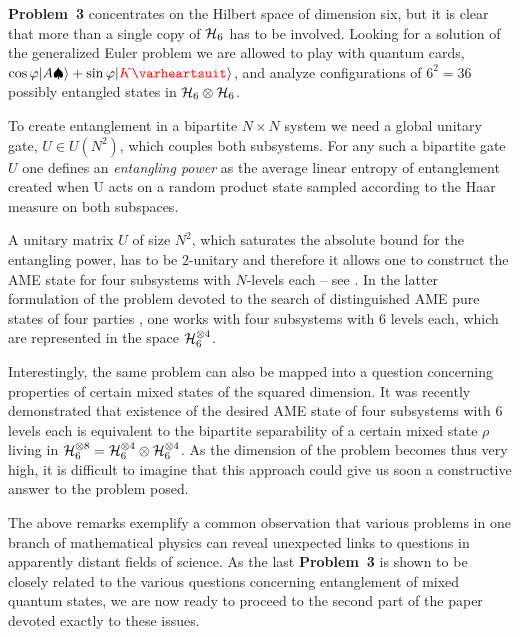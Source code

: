 \documentclass[english,aps,pra,nofootinbib,twocolumn,superscriptaddress]{revtex4-1}
\newcommand{\1}{{\rm 1\hspace{-0.9mm}l}}
\begin{document}
 {\bf Problem~3} concentrates on  the Hilbert space of dimension six,
but it is clear that more than a single copy of ${\cal H}_6$ has to be involved.
Looking for a solution of the generalized Euler problem
we are allowed to play with quantum cards,
 $\cos \varphi |A\spadesuit \rangle +  \sin \varphi | {\color{red}K\varheartsuit}\rangle$,
 and analyze configurations of $6^2=36$
   possibly entangled states in ${\cal H}_6 \otimes {\cal H}_6$.
 
 To create entanglement in a bipartite $N\times N$ system we need a global unitary gate,
 $U\in U(N^2)$, which couples both subsystems.
For any such a bipartite gate $U$ one defines an {\sl entangling power}
 \cite{ZZF00, Sc04,CGSS05} 
as the  average linear entropy of entanglement  \cite{BZ17}
created when U acts on a random product state
sampled according to the Haar measure on  both subspaces.
 
 A unitary matrix $U$ of size $N^2$, which saturates the absolute bound for the 
 entangling power,
 has to be $2$-unitary and therefore it
  allows one to construct the AME state for four subsystems
 with $N$-levels each -- see \cite{JMZL20}. 
In the latter formulation of the problem 
devoted to the search of distinguished AME pure states 
of four parties \cite{HCLRL12,HW_table},
one works with four subsystems with $6$ levels each,
 which are represented in the space  ${\cal H}_6^{\otimes 4}$.
   
 Interestingly, the same problem can also be mapped into 
 a question concerning properties of certain mixed states
 of the squared dimension.
 It was recently demonstrated \cite{YSWNG20}
 that existence of the desired AME state of four 
 subsystems with $6$ levels each is equivalent to the bipartite 
 separability of a certain mixed state $\rho$ living in 
  ${\cal H}_6^{\otimes 8}={\cal H}_6^{\otimes 4}    \otimes {\cal H}_6^{\otimes 4}$.
As the dimension of the problem becomes thus very high,
it is difficult to imagine that this approach 
could give us soon a constructive answer to the problem posed. 


\medskip

The above remarks exemplify a common observation that various 
problems in one branch of mathematical physics 
can reveal unexpected links to questions in apparently distant fields of science.
As the last {\bf Problem~3} is shown to be closely related to
the various questions concerning entanglement of  mixed quantum states,
  we are now ready to proceed to the second part of the paper
   devoted exactly to these issues.
  
\end{document}
